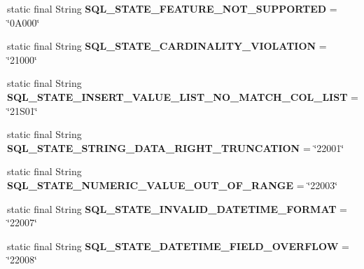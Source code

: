 \begin{DoxyCompactItemize}
static final String {\bfseries S\+Q\+L\+\_\+\+S\+T\+A\+T\+E\+\_\+\+F\+E\+A\+T\+U\+R\+E\+\_\+\+N\+O\+T\+\_\+\+S\+U\+P\+P\+O\+R\+T\+ED} = \char`\"{}0\+A000\char`\"{}
\item 
\mbox{\label{classcom_1_1mysql_1_1jdbc_1_1_s_q_l_error_a98ee6312e24c25783637c82a12bba23b}} 
static final String {\bfseries S\+Q\+L\+\_\+\+S\+T\+A\+T\+E\+\_\+\+C\+A\+R\+D\+I\+N\+A\+L\+I\+T\+Y\+\_\+\+V\+I\+O\+L\+A\+T\+I\+ON} = \char`\"{}21000\char`\"{}
\item 
\mbox{\label{classcom_1_1mysql_1_1jdbc_1_1_s_q_l_error_a76861c8be1ef58f86c34afc1498a6ce6}} 
static final String {\bfseries S\+Q\+L\+\_\+\+S\+T\+A\+T\+E\+\_\+\+I\+N\+S\+E\+R\+T\+\_\+\+V\+A\+L\+U\+E\+\_\+\+L\+I\+S\+T\+\_\+\+N\+O\+\_\+\+M\+A\+T\+C\+H\+\_\+\+C\+O\+L\+\_\+\+L\+I\+ST} = \char`\"{}21\+S01\char`\"{}
\item 
\mbox{\label{classcom_1_1mysql_1_1jdbc_1_1_s_q_l_error_af4eb33caff76c6bdcace22a05d62a2c7}} 
static final String {\bfseries S\+Q\+L\+\_\+\+S\+T\+A\+T\+E\+\_\+\+S\+T\+R\+I\+N\+G\+\_\+\+D\+A\+T\+A\+\_\+\+R\+I\+G\+H\+T\+\_\+\+T\+R\+U\+N\+C\+A\+T\+I\+ON} = \char`\"{}22001\char`\"{}
\item 
\mbox{\label{classcom_1_1mysql_1_1jdbc_1_1_s_q_l_error_a34c29e07cf748f564a5aeafc03d00052}} 
static final String {\bfseries S\+Q\+L\+\_\+\+S\+T\+A\+T\+E\+\_\+\+N\+U\+M\+E\+R\+I\+C\+\_\+\+V\+A\+L\+U\+E\+\_\+\+O\+U\+T\+\_\+\+O\+F\+\_\+\+R\+A\+N\+GE} = \char`\"{}22003\char`\"{}
\item 
\mbox{\label{classcom_1_1mysql_1_1jdbc_1_1_s_q_l_error_aba4b441761ef96cd8db12449a51e5bfa}} 
static final String {\bfseries S\+Q\+L\+\_\+\+S\+T\+A\+T\+E\+\_\+\+I\+N\+V\+A\+L\+I\+D\+\_\+\+D\+A\+T\+E\+T\+I\+M\+E\+\_\+\+F\+O\+R\+M\+AT} = \char`\"{}22007\char`\"{}
\item 
\mbox{\label{classcom_1_1mysql_1_1jdbc_1_1_s_q_l_error_afb6f712025971d21ff8a8076d70e5614}} 
static final String {\bfseries S\+Q\+L\+\_\+\+S\+T\+A\+T\+E\+\_\+\+D\+A\+T\+E\+T\+I\+M\+E\+\_\+\+F\+I\+E\+L\+D\+\_\+\+O\+V\+E\+R\+F\+L\+OW} = \char`\"{}22008\char`\"{}

\end{DoxyCompactItemize}
